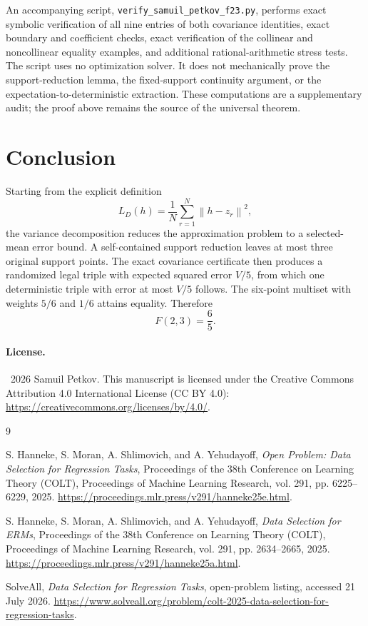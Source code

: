 \documentclass[11pt]{article}
\theoremstyle{definition}
\theoremstyle{remark}
\newcommand{\norm}[1]{\left\lVert #1\right\rVert}
\begin{document}
An accompanying script, \texttt{verify\_samuil\_petkov\_f23.py}, performs exact symbolic verification of all nine entries of both covariance identities, exact boundary and coefficient checks, exact verification of the collinear and noncollinear equality examples, and additional rational-arithmetic stress tests.  The script uses no optimization solver.  It does not mechanically prove the support-reduction lemma, the fixed-support continuity argument, or the expectation-to-deterministic extraction.  These computations are a supplementary audit; the proof above remains the source of the universal theorem.

\section*{Conclusion}

Starting from the explicit definition
\[
L_D(h)=\frac1N\sum_{r=1}^N\norm{h-z_r}^2,
\]
the variance decomposition reduces the approximation problem to a selected-mean error bound.  A self-contained support reduction leaves at most three original support points.  The exact covariance certificate then produces a randomized legal triple with expected squared error $V/5$, from which one deterministic triple with error at most $V/5$ follows.  The six-point multiset with weights $5/6$ and $1/6$ attains equality.  Therefore
\[
\boxed{F(2,3)=\frac65}.
\]

\paragraph{License.}
\textcopyright\ 2026 Samuil Petkov.  This manuscript is licensed under the Creative Commons Attribution 4.0 International License (CC BY 4.0):
\url{https://creativecommons.org/licenses/by/4.0/}.

\begin{thebibliography}{9}

S. Hanneke, S. Moran, A. Shlimovich, and A. Yehudayoff,
\emph{Open Problem: Data Selection for Regression Tasks},
Proceedings of the 38th Conference on Learning Theory (COLT),
Proceedings of Machine Learning Research, vol. 291, pp. 6225--6229, 2025.
\url{https://proceedings.mlr.press/v291/hanneke25e.html}.

S. Hanneke, S. Moran, A. Shlimovich, and A. Yehudayoff,
\emph{Data Selection for ERMs},
Proceedings of the 38th Conference on Learning Theory (COLT),
Proceedings of Machine Learning Research, vol. 291, pp. 2634--2665, 2025.
\url{https://proceedings.mlr.press/v291/hanneke25a.html}.

SolveAll,
\emph{Data Selection for Regression Tasks},
open-problem listing, accessed 21 July 2026.
\url{https://www.solveall.org/problem/colt-2025-data-selection-for-regression-tasks}.

\end{thebibliography}
\end{document}
